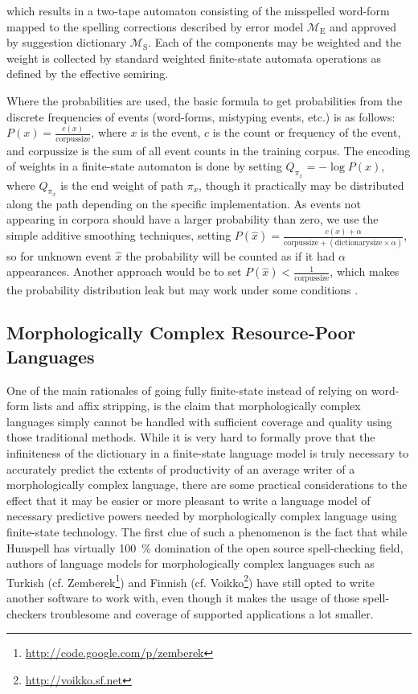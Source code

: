 \documentclass[a4paper,12pt]{article}
\begin{document}
which results in a two-tape automaton consisting of the misspelled word-form
mapped to the spelling corrections described by
error model $\mathcal{M}_\mathrm{E}$ and approved by suggestion dictionary
$\mathcal{M}_\mathrm{S}$. Each of the components may be weighted and the
weight is collected by standard weighted finite-state automata operations as
defined by the effective semiring.

Where the probabilities are used, the basic formula to get probabilities from
the discrete frequencies of events (word-forms, mistyping events, etc.) is
as follows: $P(x) = \frac{c(x)}{\mathrm{corpus size}}$, where $x$ is the event,
$c$ is the count or frequency of the event, and $\mathrm{corpus size}$ is the
sum of all event counts in the training corpus. The encoding of weights in a
finite-state automaton is done by setting $Q_{\pi_x} = -\log P(x)$, where
$Q_{\pi_x}$ is the end weight of path $\pi_x$, though it practically may be
distributed along the path depending on the specific implementation. As events
not appearing in corpora should have a larger probability than zero, we use the
simple additive smoothing techniques, setting $P(\hat{x}) = \frac{c(x) +
\alpha}{\mathrm{corpus size} + (\mathrm{dictionary size} \times \alpha)}$, so
for unknown event $\hat{x}$ the probability will be counted as if it had
$\alpha$ appearances. Another approach would be to set $P(\hat{x}) <
\frac{1}{\mathrm{corpus size}}$, which makes the probability distribution leak
but may work under some conditions \cite[]{brants2007large}.

\subsection{Morphologically Complex Resource-Poor Languages}
\label{subsec:morphologically-complex}

One of the main rationales of going fully finite-state instead of relying on
word-form lists and affix stripping, is the claim that morphologically complex
languages simply cannot be handled with sufficient coverage and quality using
those traditional methods. While it is very hard to formally prove that the
infiniteness of the dictionary in a finite-state language model is truly
necessary to accurately predict the extents of productivity of an average
writer of a morphologically complex language, there are some practical
considerations to the effect that it may be easier or more pleasant to write a
language model of necessary predictive powers needed by morphologically complex
language using finite-state technology. The first clue of such a phenomenon is
the fact that while Hunspell has virtually 100~\% domination of the open source
spell-checking field, authors of language models for morphologically
complex languages such as Turkish (cf.
Zemberek\footnote{\url{http://code.google.com/p/zemberek}}) and Finnish (cf.
Voikko\footnote{\url{http://voikko.sf.net}}) have still opted to write another
software to work with, even though it makes the usage of those spell-checkers
troublesome and coverage of supported applications a lot smaller.  %
\end{document}
